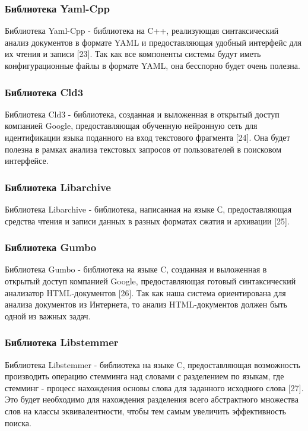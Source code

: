 \subsubsection{Библиотека Yaml-Cpp}

Библиотека Yaml-Cpp - библиотека на C++, реализующая синтаксический анализ документов в формате YAML и предоставляющая удобный интерфейс для их чтения и записи [23]. Так как все компоненты системы будут иметь конфигурационные файлы в формате YAML, она бесспорно будет очень полезна.

\subsubsection{Библиотека Cld3}

Библиотека Cld3 - библиотека, созданная и выложенная в открытый доступ компанией Google, предоставляющая обученную нейронную сеть для идентификации языка поданного на вход текстового фрагмента [24]. Она будет полезна в рамках анализа текстовых запросов от пользователей в поисковом интерфейсе.

\subsubsection{Библиотека Libarchive}

Библиотека Libarchive - библиотека, написанная на языке С, предоставляющая средства чтения и записи данных в разных форматах сжатия и архивации [25].

\subsubsection{Библиотека Gumbo}

Библиотека Gumbo - библиотека на языке C, созданная и выложенная в открытый доступ компанией Google, предоставляющая готовый синтаксический анализатор HTML-документов [26]. Так как наша система ориентирована для анализа документов из Интернета, то анализ HTML-документов должен быть одной из важных задач. 

\subsubsection{Библиотека Libstemmer}

Библиотека Libstemmer - библиотека на языке C, предоставляющая возможность производить операцию стемминга над словами с разделением по языкам, где стемминг - процесс нахождения основы слова для заданного исходного слова [27]. Это будет необходимо для нахождения разделения всего абстрактного множества слов на классы эквивалентности, чтобы тем самым увеличить эффективность поиска. 

